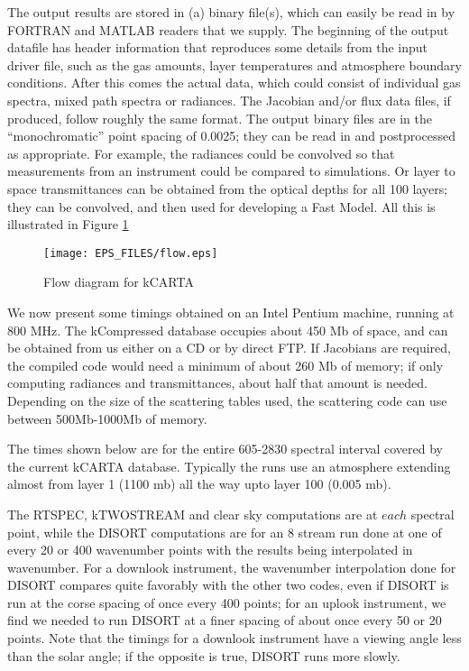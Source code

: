 \documentclass[11pt]{article}
\newcommand{\kc}{\textsf{kCARTA}\xspace}
\begin{document}
The output results are stored in (a) binary file(s), which can easily be read 
in by FORTRAN and MATLAB readers that we supply. The beginning of the output 
datafile has header information that reproduces 
some details from the input driver file, such as the gas amounts, layer 
temperatures and atmosphere boundary conditions. After this comes the actual 
data, which could consist of individual gas spectra, mixed path spectra or 
radiances. The Jacobian and/or flux data files, if produced, follow roughly 
the same format. The output binary files are in the ``monochromatic'' point 
spacing of 0.0025\wn; they can be read in and postprocessed as appropriate. 
For example, the radiances could be convolved so that measurements from an 
instrument could be compared to simulations. Or layer to space transmittances
can be obtained from the optical depths for all 100 layers; they can be 
convolved, and then used for developing a Fast Model. All this is illustrated
in Figure \ref{fig:flow}

\begin{figure}
\texttt{[image: EPS\_FILES/flow.eps]}
  \caption{Flow diagram for \textsf{kCARTA}}
  \label{fig:flow} 
\end{figure} 

We now present some timings obtained on an Intel Pentium machine, running at 
800 MHz.  The kCompressed database occupies about 450 Mb of space, and can
be obtained from us either on a CD or by direct FTP. If Jacobians are 
required, the compiled code would need a minimum of about 260 Mb of memory; if
only computing radiances and transmittances, about half that amount is 
needed. Depending on the size of the scattering tables used, the scattering
code can use between 500Mb-1000Mb of memory. 

The times shown below are for the entire 605-2830 \wn spectral 
interval covered by the current \kc database.  Typically the runs use an 
atmosphere extending almost from layer 1 (1100 mb) all the way upto layer 
100 (0.005 mb).

The \textsf{RTSPEC, kTWOSTREAM} and clear sky computations are at $each$ 
spectral point, while the \textsf{DISORT} computations are for an 8 stream
run done at one of every 20 or 400 wavenumber points with the results being 
interpolated in wavenumber. For a downlook instrument, the wavenumber 
interpolation done for \textsf{DISORT} compares quite favorably with the other
two codes, even if \textsf{DISORT} is run at the corse spacing of once every 
400 points; for an uplook instrument, we find we needed to run \textsf{DISORT}
at a finer spacing of about once every 50 or 20 points. Note that 
the timings for a downlook instrument have a viewing angle less than the solar
angle; if the opposite is true, \textsf{DISORT} runs more slowly.
\end{document}

